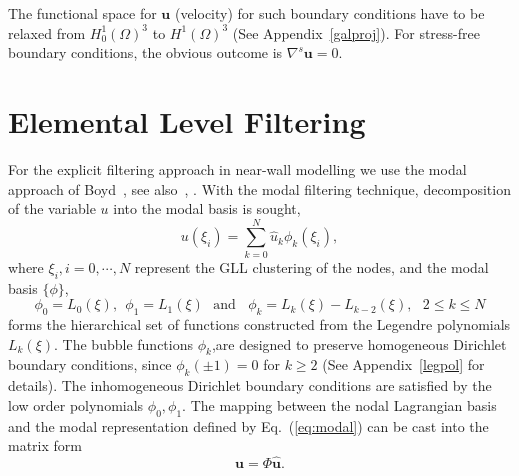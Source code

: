 The functional space for $\pmb{u}$ (velocity) for such boundary conditions have to be relaxed from $H_0^1(\Omega)^3$ to $H^1(\Omega)^3$ (See Appendix~\ref{galproj}). For stress-free boundary conditions, the obvious outcome is $\nabla^{s} \pmb{u} = 0$.


\section{Elemental Level Filtering}\label{elfilt}
For the explicit filtering approach in near-wall modelling we use the modal approach of Boyd~\cite{boyd3}, see also~\cite{black}, \cite{bouf}. With the modal filtering technique, decomposition of the variable $u$ into the modal basis is sought,
\begin{equation}
u(\xi_i) = \sum_{k=0}^N{\hat{u}_k\phi_k(\xi_i)},\label{eq:modal}
\end{equation}
where $\xi_i, i = 0, \cdots, N$ represent the GLL clustering of the nodes, and the modal basis $\{\phi\}$,
\begin{equation}
\phi_0 = L_0(\xi),\ \ \phi_1 = L_1(\xi) \ \ \ \mbox{and}\ \ \ \ \phi_k = L_k(\xi) - L_{k-2}(\xi), \ \ \ 2\le k\le N  
\end{equation}
forms the hierarchical set of functions constructed from the Legendre polynomials $L_k(\xi)$. The bubble functions $\phi_k$,are designed to preserve homogeneous Dirichlet boundary conditions, since $\phi_k(\pm 1) = 0$ for $k\geq 2$ (See Appendix~\ref{legpol} for details). The inhomogeneous Dirichlet boundary conditions are satisfied by the low order polynomials $\phi_0, \phi_1$. The mapping between the nodal Lagrangian basis and the modal representation defined by Eq.~(\ref{eq:modal}) can be cast into the matrix form\begin{equation}
\pmb{u} = \Phi \pmb{\hat{u}}.
\end{equation}

